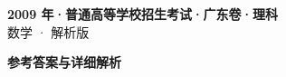 \documentclass[zihao=-4, a4paper]{ctexart}
\begin{document}
\begin{center}
  {\Large\bfseries 2009 年·普通高等学校招生考试·广东卷·理科}\\[4pt]
  {\large 数学 · 解析版}
\end{center}
\medskip
{}

\clearpage
{}
\begin{center}{\Large\bfseries 参考答案与详细解析}\end{center}
\medskip

\end{document}
